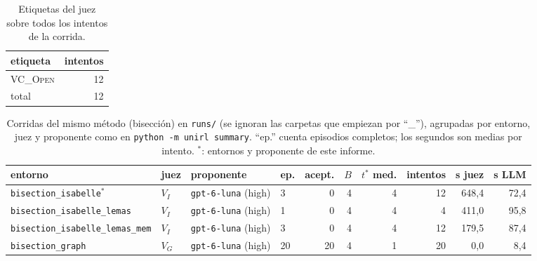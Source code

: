 \documentclass[11pt,a4paper]{article}
\begin{document}
\begin{table}[!ht]
\centering
\footnotesize
\begin{tabular}{@{}lr@{}}
\toprule
etiqueta & intentos \\
\midrule
\textsc{VC\_Open} & 12 \\
total & 12 \\
\bottomrule
\end{tabular}
\caption{Etiquetas del juez sobre todos los intentos de la corrida.}
\label{tab:etiquetas}
\end{table}

\begin{table}[!ht]
\centering
\scriptsize
\begin{tabular}{@{}llllrrrrrr@{}}
\toprule
entorno & juez & proponente & ep. & acept. & $B$ & $t^*$ med. & intentos & s juez & s LLM \\
\midrule
\texttt{bisection\_\allowbreak{}isabelle}$^\ast$ & $V_I$ & \texttt{gpt-\allowbreak{}6-\allowbreak{}luna} (high) & 3 & 0 & 4 & 4 & 12 & 648{,}4 & 72{,}4 \\
\texttt{bisection\_\allowbreak{}isabelle\_\allowbreak{}lemas} & $V_I$ & \texttt{gpt-\allowbreak{}6-\allowbreak{}luna} (high) & 1 & 0 & 4 & 4 & 4 & 411{,}0 & 95{,}8 \\
\texttt{bisection\_\allowbreak{}isabelle\_\allowbreak{}lemas\_\allowbreak{}mem} & $V_I$ & \texttt{gpt-\allowbreak{}6-\allowbreak{}luna} (high) & 3 & 0 & 4 & 4 & 12 & 179{,}5 & 87{,}4 \\
\texttt{bisection\_\allowbreak{}graph} & $V_G$ & \texttt{gpt-\allowbreak{}6-\allowbreak{}luna} (high) & 20 & 20 & 4 & 1 & 20 & 0{,}0 & 8{,}4 \\
\bottomrule
\end{tabular}
\caption{Corridas del mismo método (bisección) en \texttt{runs/} (se ignoran las carpetas que empiezan por ``\_''), agrupadas por entorno, juez y proponente como en \texttt{python -m unirl summary}. ``ep.'' cuenta episodios completos; los segundos son medias por intento. $^\ast$: entornos y proponente de este informe.}
\label{tab:comparacion}
\end{table}
\end{document}
